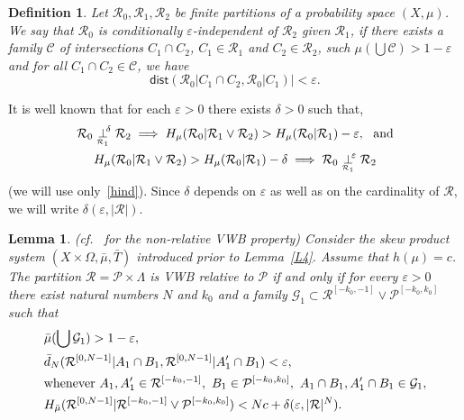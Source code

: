 \documentclass{amsart}
\newtheorem{lem}[thm]{Lemma}
\newtheorem{defn}[thm]{Definition}
\theoremstyle{remark}
\def \R {\mathcal R}
\def \C {\mathcal C}
\def \G {\mathcal G}
\def \P {\mathcal P}
\def \eps {\varepsilon}
\def \dist{\mathsf{dist}}
\begin{document}
\begin{defn}\label{epsind}
Let $\R_0,\R_1,\R_2$ be finite partitions of a probability space $(X,\mu)$. We say that \emph{$\R_0$ is conditionally $\eps$-independent of $\R_2$ given $\R_1$}, if there exists a family $\C$ of intersections $C_1\cap C_2$, $C_1\in\R_1$ and $C_2\in\R_2$, such $\mu(\bigcup\C)>1-\eps$ and for all $C_1\cap C_2\in\C$, we have
$$
\dist(\R_0|C_1\cap C_2,\R_0|C_1)|<\eps.
$$
\end{defn}

It is well known that for each $\eps>0$ there exists $\delta>0$ such that, \begin{gather}
\R_0\underset{^{\R_1}}\perp^{\!\!\delta}\R_2\implies H_\mu(\R_0|\R_1\vee\R_2)>H_\mu(\R_0|\R_1)-\eps,\text{ \ and}\notag\\
H_\mu(\R_0|\R_1\vee\R_2)>H_\mu(\R_0|\R_1)-\delta\implies\R_0\underset{^{\R_1}}\perp^{\!\!\eps}\R_2\label{hind}
\end{gather}
(we will use only~\eqref{hind}). 
Since $\delta$ depends on $\eps$ as well as on the cardinality of $\R$, we will write $\delta(\eps,|\R|)$.

\begin{lem}\label{L5}{\rm(cf.~\cite[Lemma~4]{12a} for the non-relative VWB property)} Consider the skew product system $(X\times\Omega,\bar\mu,\bar T)$ introduced prior to Lemma~\ref{L4}.
Assume that $h(\mu)=c$. The partition $\R=\P\times\Lambda$ is VWB relative to $\P$  if and only if for every $\eps>0$ there exist natural numbers $N$ and $k_0$ and a family $\G_1\subset\R^{[-k_0,-1]}\vee\P^{[-k_0,k_0]}$ such that
\begin{align}
&\bar\mu(\bigcup\G_1)>1-\eps,\label{cc}\\
&\bar d_N(\R^{[0,N-1]}|A_1\cap B_1, \R^{[0,N-1]}|A'_1\cap B_1) <\eps,\label{dd}\\ 
&\text{whenever }A_1,A_1'\in\R^{[-k_0,-1]},\ B_1\in\P^{[-k_0,k_0]},\ A_1\cap B_1, A'_1\cap B_1\in\G_1,\notag\\
&H_{\bar\mu}(\R^{[0,N-1]}|\R^{[-k_0,-1]}\vee\P^{[-k_0,k_0]})<Nc+\delta(\eps,|\R|^N).\label{ee}
\end{align}
\end{lem}
\end{document}
